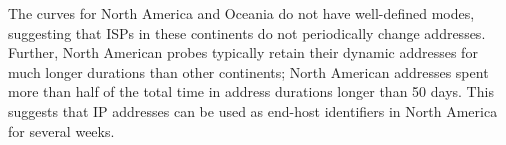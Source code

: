 The curves for North America and Oceania do not have well-defined
modes, suggesting that ISPs in these continents do not periodically
change addresses. Further, North American probes typically retain
their dynamic addresses for much longer durations than other
continents; North American addresses spent more than half of the total
time in address durations longer than 50 days. This suggests that IP
addresses can be used as end-host identifiers in North America for
several weeks.

\begin{comment}

\subsubsection{Which countries are most likely to have periodic address changes?}

\begin{figure}[tb]
  \begin{center}
    \texttt{[image: addr\_change/figs/top\_periodic\_ctrys\_a\_all\_ip\_durs\_connlogs\_wtd\_cdf]}
  \end{center}
  \caption{\label{fig:top_ctrys_periodic_all_durs}
    Cumulative distribution of total time fraction per country for the
    countries that had the most periodic addresses. The use of 24 hour
    durations could be geographically correlated, with German,
    Austrian and Polish addresses spending large proportions of their
    total time in this 24 hour durations.
  }
\end{figure}

Next, we examine which countries were most likely to have dynamic
addresses with periodic durations. Among all countries for which we
had at least 10 years of cumulative address durations, we found the
countries which had the highest proportion of addresses that appeared
periodic. To determine if addresses appeared periodic, we found
address durations that were within an hour of each other, summed
them, and found what proportion of total duration this sum
constituted. For these countries, we show the 
cumulative distribution of total time fractions per duration
aggregated per country in Figure~\ref{fig:top_ctrys_periodic_all_durs}.

German and Austrian address durations have total time fractions
exceeding 0.5 at 24 hours, and Polish address durations observe a
smaller mode of 0.17 at 24 hours. 24 hour durations are not limited to
Central Europe, however; Kazakhstan also observes a total time
fraction of 0.42 at 24 hours. French addresses have a total time
fraction of 0.03 at 24 hours but observe a much larger mode of 0.47 at
168 hours (1 week).

\end{comment}

